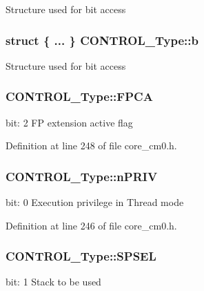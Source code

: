 Structure used for bit access \hypertarget{union_c_o_n_t_r_o_l___type_aa4d954e3b3024e7d3f2e7fb52b1cfa77}{
\subsubsection[{b}]{\setlength{\rightskip}{0pt plus 5cm}struct \{ ... \}   C\-O\-N\-T\-R\-O\-L\-\_\-\-Type\-::b}}\label{union_c_o_n_t_r_o_l___type_aa4d954e3b3024e7d3f2e7fb52b1cfa77}
Structure used for bit access \hypertarget{union_c_o_n_t_r_o_l___type_ac62cfff08e6f055e0101785bad7094cd}{
\subsubsection[{F\-P\-C\-A}]{ C\-O\-N\-T\-R\-O\-L\-\_\-\-Type\-::\-F\-P\-C\-A}}\label{union_c_o_n_t_r_o_l___type_ac62cfff08e6f055e0101785bad7094cd}
bit\-: 2 F\-P extension active flag 

Definition at line 248 of file core\-\_\-cm0.\-h.

\hypertarget{union_c_o_n_t_r_o_l___type_a35c1732cf153b7b5c4bd321cf1de9605}{
\subsubsection[{n\-P\-R\-I\-V}]{ C\-O\-N\-T\-R\-O\-L\-\_\-\-Type\-::n\-P\-R\-I\-V}}\label{union_c_o_n_t_r_o_l___type_a35c1732cf153b7b5c4bd321cf1de9605}
bit\-: 0 Execution privilege in Thread mode 

Definition at line 246 of file core\-\_\-cm0.\-h.

\hypertarget{union_c_o_n_t_r_o_l___type_a8cc085fea1c50a8bd9adea63931ee8e2}{
\subsubsection[{S\-P\-S\-E\-L}]{ C\-O\-N\-T\-R\-O\-L\-\_\-\-Type\-::\-S\-P\-S\-E\-L}}\label{union_c_o_n_t_r_o_l___type_a8cc085fea1c50a8bd9adea63931ee8e2}
bit\-: 1 Stack to be used 

